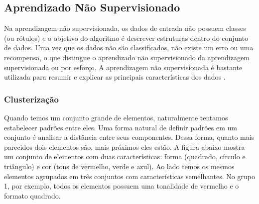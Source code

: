 \clearpage
\subsection{Aprendizado Não Supervisionado}

Na aprendizagem não supervisionada, os dados de entrada não possuem classes (ou rótulos) e o objetivo do algoritmo é descrever estruturas dentro do conjunto de dados. Uma vez que os dados não são classificados, não existe um erro ou uma recompensa, o que distingue o aprendizado não supervisionado da aprendizagem supervisionada ou por esforço. A aprendizagem não supervisionada é bastante utilizada para resumir e explicar as principais características dos dados \cite{jordan2004}.


\subsubsection{Clusterização}
\label{sec:clusterização}

Quando temos um conjunto grande de elementos, naturalmente tentamos estabelecer padrões entre eles. Uma forma natural de definir padrões em um conjunto é analisar a distância entre seus componentes. Dessa forma, quanto mais parecidos dois elementos são, mais próximos eles estão. A figura abaixo mostra um conjunto de elementos com duas características: forma (quadrado, círculo e triângulo) e cor (tons de vermelho, verde e azul). Ao lado temos os mesmos elementos agrupados em três conjuntos com características semelhantes. No grupo 1, por exemplo, todos os elementos possuem uma tonalidade de vermelho e o formato quadrado.


